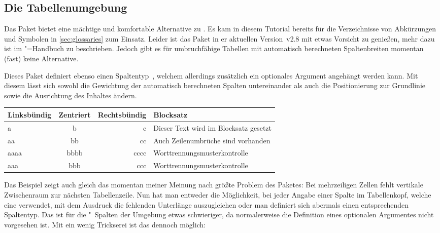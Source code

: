 \documentclass[%
  english,ngerman,%
  geometry=no,DIV=12,automark,%
]{tudscrartcl}
\makeatletter
\newcommand*\pcolumnfuzz[1]{\pretocmd{\@endpbox}{\hfuzz=#1}{}{}}
\makeatother
\begin{document}
\subsection{Die Tabellenumgebung }
Das Paket  bietet eine mächtige und komfortable Alternative zu 
. Es kam in diesem Tutorial bereits für die Verzeichnisse von 
Abkürzungen und Symbolen in \autoref{sec:glossaries} zum Einsatz. Leider ist 
das Paket in er aktuellen Version~v2.8 mit etwas Vorsicht zu genießen, mehr 
dazu ist im \TUDScript"=Handbuch zu  beschrieben. Jedoch gibt es 
für umbruchfähige Tabellen mit automatisch berechneten Spaltenbreiten momentan 
(fast) keine Alternative. 

Dieses Paket definiert ebenso einen Spaltentyp~, welchem allerdings 
zusätzlich ein optionales Argument angehängt werden kann. Mit diesem lässt sich 
sowohl die Gewichtung der automatisch berechneten Spalten untereinander als 
auch die Positionierung zur Grundlinie sowie die Ausrichtung des Inhaltes 
ändern.
%
\begingroup
\pcolumnfuzz{70pt}
\begin{Hint}
\begin{tabu} to 11.7cm {lcrX}
\toprule
\textbf{Linksbündig} & \textbf{Zentriert} & 
\textbf{Rechtsbündig} & \textbf{Blocksatz} \tabularnewline
\midrule
a    & b    & c    & Dieser Text wird im Blocksatz gesetzt\tabularnewline
aa   & bb   & cc   & Auch Zeilenumbrüche sind vorhanden\tabularnewline
aaaa & bbbb & cccc & Worttrennungsmus\-terkontrolle\tabularnewline
aaa  & bbb  & ccc  & Worttrennungsmusterkontrolle\tabularnewline
\bottomrule
\end{tabu}
\end{Hint}
\endgroup
%
Das Beispiel zeigt auch gleich das momentan meiner Meinung nach größte Problem 
des Paketes: Bei mehrzeiligen Zellen fehlt vertikale Zwischenraum zur nächsten 
Tabellenzeile. Nun hat man entweder die Möglichkeit, bei jeder Angabe einer 
Spalte im Tabellenkopf, welche eine  verwendet, mit dem Ausdruck 
 die fehlenden Unterlänge auszugleichen oder man 
definiert sich abermals einen entsprechenden Spaltentyp. Das ist für die 
"~Spalten der Umgebung  etwas schwieriger, da 
 normalerweise die Definition eines optionalen Argumentes 
nicht vorgesehen ist. Mit ein wenig Trickserei ist das dennoch möglich:
%
\InputHook{\renewcommand*{\newcolumntype}[2]{}}
\begin{Excerpt}
\makeatletter
\newcolumntype{Z}{}
\renewcommand*\NC@rewrite@Z[1][]{%
  \NC@find>{\hspace{0pt}}X[#1]<{\@finalstrut\@arstrutbox}%
}
\makeatother
\end{Excerpt}
\end{document}
